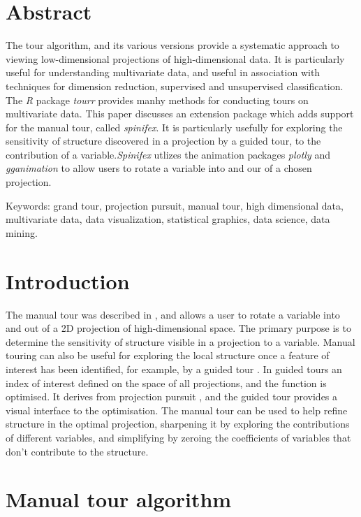 \documentclass{monashthesis}
\begin{document}
\hypertarget{abstract-1}{%
\section{Abstract}\label{abstract-1}}

The tour algorithm, and its various versions provide a systematic approach to viewing low-dimensional projections of high-dimensional data. It is particularly useful for understanding multivariate data, and useful in association with techniques for dimension reduction, supervised and unsupervised classification. The \emph{R} package \emph{tourr} provides manhy methods for conducting tours on multivariate data. This paper discusses an extension package which adds support for the manual tour, called \emph{spinifex}. It is particularly usefully for exploring the sensitivity of structure discovered in a projection by a guided tour, to the contribution of a variable.\emph{Spinifex} utlizes the animation packages \emph{plotly} and \emph{gganimation} to allow users to rotate a variable into and our of a chosen projection.

Keywords: grand tour, projection pursuit, manual tour, high dimensional data, multivariate data, data visualization, statistical graphics, data science, data mining.

\hypertarget{introduction}{%
\section{Introduction}\label{introduction}}

The manual tour was described in \textcite{cook_manual_1997}, and allows a user to rotate a variable into and out of a 2D projection of high-dimensional space. The primary purpose is to determine the sensitivity of structure visible in a projection to a variable. Manual touring can also be useful for exploring the local structure once a feature of interest has been identified, for example, by a guided tour \autocite{hurley_analyzing_1990}. In guided tours an index of interest defined on the space of all projections, and the function is optimised. It derives from projection pursuit \autocite{friedman_projection_1974}, and the guided tour provides a visual interface to the optimisation. The manual tour can be used to help refine structure in the optimal projection, sharpening it by exploring the contributions of different variables, and simplifying by zeroing the coefficients of variables that don't contribute to the structure.

\hypertarget{manual-tour-algorithm}{%
\section{Manual tour algorithm}\label{manual-tour-algorithm}}
\end{document}

